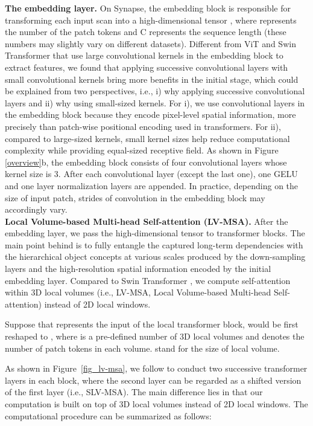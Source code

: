 \documentclass[journal,twoside,web]{ieeecolor}
\begin{document}
\noindent \textbf{The embedding layer.} On Synapse, the embedding block is responsible for transforming each input scan  into a high-dimensional tensor , where  represents the number of the patch tokens and C represents the sequence length (these numbers may slightly vary on different datasets). Different from ViT \cite{dosovitskiy2020image} and Swin Transformer \cite{liu2021swin} that use large convolutional kernels in the embedding block to extract features, we found that applying {successive} convolutional layers with {small} convolutional kernels bring more benefits in the initial stage, which could be explained from two perspectives, i.e., i) {why applying successive convolutional layers} and ii) {why using small-sized kernels}. For i), we use convolutional layers in the embedding block because they encode pixel-level spatial information, more precisely than patch-wise positional encoding used in transformers. For ii), compared to large-sized kernels, small kernel sizes help reduce computational complexity while providing equal-sized receptive field. As shown in Figure \ref{overview}b, the embedding block consists of four convolutional layers whose kernel size is 3. After each convolutional layer (except the last one), one GELU \cite{hendrycks2016gaussian} and one layer normalization \cite{ba2016layer} layers are appended. In practice, depending on the size of input patch, strides of convolution in the embedding block may accordingly vary.\\

\noindent \textbf{Local Volume-based Multi-head Self-attention (LV-MSA).} After the embedding layer, we pass the high-dimensional tensor  to transformer blocks. The main point behind is to fully {entangle the captured long-term dependencies} with {the hierarchical object concepts at various scales produced by the down-sampling layers} and {the high-resolution spatial information encoded by the initial embedding layer}. Compared to Swin Transformer \cite{liu2021swin}, we compute self-attention within 3D local volumes (i.e., LV-MSA, Local Volume-based Multi-head Self-attention) instead of 2D local windows. 

Suppose that  represents the input of the local transformer block,  would be first reshaped to , where  is a pre-defined number of 3D local volumes and  denotes the number of patch tokens in each volume.  stand for the size of local volume. 



As shown in Figure~\ref{fig_lv-msa}, we follow \cite{liu2021swin} to conduct two successive transformer layers in each block, where the second layer can be regarded as a shifted version of the first layer (i.e., SLV-MSA). The main difference lies in that our computation is built on top of 3D local volumes instead of 2D local windows. The computational procedure can be summarized as follows:
\end{document}
